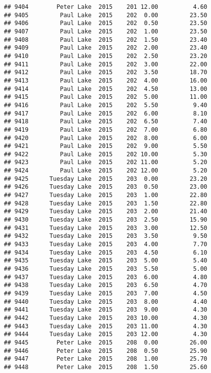 \documentclass[
]{article}
\begin{document}
\begin{verbatim}
## 9404        Peter Lake  2015    201 12.00          4.60
## 9405         Paul Lake  2015    202  0.00         23.50
## 9406         Paul Lake  2015    202  0.50         23.50
## 9407         Paul Lake  2015    202  1.00         23.50
## 9408         Paul Lake  2015    202  1.50         23.40
## 9409         Paul Lake  2015    202  2.00         23.40
## 9410         Paul Lake  2015    202  2.50         23.20
## 9411         Paul Lake  2015    202  3.00         22.00
## 9412         Paul Lake  2015    202  3.50         18.70
## 9413         Paul Lake  2015    202  4.00         16.00
## 9414         Paul Lake  2015    202  4.50         13.00
## 9415         Paul Lake  2015    202  5.00         11.00
## 9416         Paul Lake  2015    202  5.50          9.40
## 9417         Paul Lake  2015    202  6.00          8.10
## 9418         Paul Lake  2015    202  6.50          7.40
## 9419         Paul Lake  2015    202  7.00          6.80
## 9420         Paul Lake  2015    202  8.00          6.00
## 9421         Paul Lake  2015    202  9.00          5.50
## 9422         Paul Lake  2015    202 10.00          5.30
## 9423         Paul Lake  2015    202 11.00          5.20
## 9424         Paul Lake  2015    202 12.00          5.20
## 9425      Tuesday Lake  2015    203  0.00         23.20
## 9426      Tuesday Lake  2015    203  0.50         23.00
## 9427      Tuesday Lake  2015    203  1.00         22.80
## 9428      Tuesday Lake  2015    203  1.50         22.80
## 9429      Tuesday Lake  2015    203  2.00         21.40
## 9430      Tuesday Lake  2015    203  2.50         15.90
## 9431      Tuesday Lake  2015    203  3.00         12.50
## 9432      Tuesday Lake  2015    203  3.50          9.50
## 9433      Tuesday Lake  2015    203  4.00          7.70
## 9434      Tuesday Lake  2015    203  4.50          6.10
## 9435      Tuesday Lake  2015    203  5.00          5.40
## 9436      Tuesday Lake  2015    203  5.50          5.00
## 9437      Tuesday Lake  2015    203  6.00          4.80
## 9438      Tuesday Lake  2015    203  6.50          4.70
## 9439      Tuesday Lake  2015    203  7.00          4.50
## 9440      Tuesday Lake  2015    203  8.00          4.40
## 9441      Tuesday Lake  2015    203  9.00          4.30
## 9442      Tuesday Lake  2015    203 10.00          4.30
## 9443      Tuesday Lake  2015    203 11.00          4.30
## 9444      Tuesday Lake  2015    203 12.00          4.30
## 9445        Peter Lake  2015    208  0.00         26.00
## 9446        Peter Lake  2015    208  0.50         25.90
## 9447        Peter Lake  2015    208  1.00         25.70
## 9448        Peter Lake  2015    208  1.50         25.60

\end{verbatim}
\end{document}
